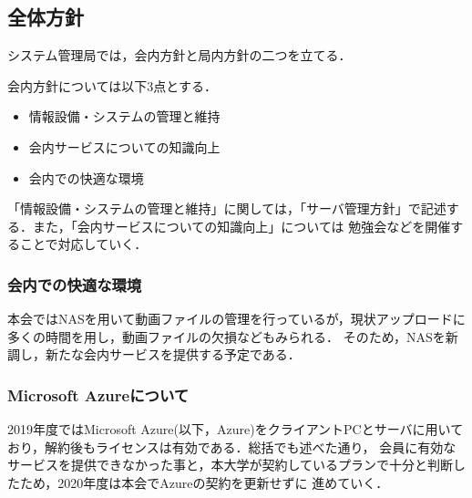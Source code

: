 \subsection*{全体方針}


システム管理局では，会内方針と局内方針の二つを立てる．

会内方針については以下3点とする．
\begin{itemize}
    \item 情報設備・システムの管理と維持
    \item 会内サービスについての知識向上
    \item 会内での快適な環境
\end{itemize}

「情報設備・システムの管理と維持」に関しては，「サーバ管理方針」で記述する．また，「会内サービスについての知識向上」については
勉強会などを開催することで対応していく．
\subsubsection*{会内での快適な環境}
本会ではNASを用いて動画ファイルの管理を行っているが，現状アップロードに多くの時間を用し，動画ファイルの欠損などもみられる．
そのため，NASを新調し，新たな会内サービスを提供する予定である．

\subsubsection*{Microsoft Azureについて}
2019年度ではMicrosoft Azure(以下，Azure)をクライアントPCとサーバに用いており，解約後もライセンスは有効である．総括でも述べた通り，
会員に有効なサービスを提供できなかった事と，本大学が契約しているプランで十分と判断したため，2020年度は本会でAzureの契約を更新せずに
進めていく．



  